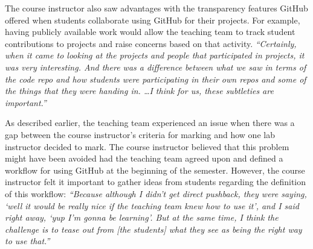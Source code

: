 The course instructor also saw advantages with the transparency features GitHub offered when students collaborate using GitHub for their projects. For example, having publicly available work would allow the teaching team to track student contributions to projects and raise concerns based on that activity. \textit{``Certainly, when it came to looking at the projects and people that participated in projects, it was very interesting. And there was a difference between what we saw in terms of the code repo and how students were participating in their own repos and some of the things that they were handing in. \ldots I think for us, these subtleties are important.''}


As described earlier, the teaching team experienced an issue when there was a gap between the course instructor's criteria for marking and how one lab instructor decided to mark. The course instructor believed that this problem might have been avoided had the teaching team agreed upon and defined a workflow for using GitHub at the beginning of the semester. However, the course instructor felt it important to gather ideas from students regarding the definition of this workflow: \textit{``Because although I didn't get direct pushback, they were saying, `well it would be really nice if the teaching team knew how to use it', and I said right away, `yup I'm gonna be learning'. But at the same time, I think the challenge is to tease out from [the students] what they see as being the right way to use that.''}


